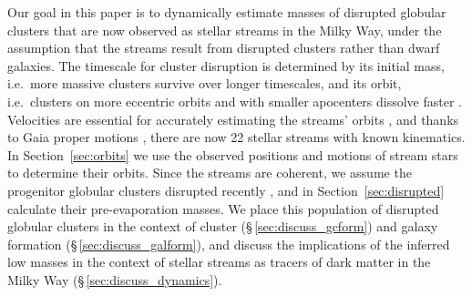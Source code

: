 \documentclass[twocolumn]{aastex63}
\newcommand{\msun}{\ensuremath{\textrm{M}_\odot}}
\begin{document}
Our goal in this paper is to dynamically estimate masses of disrupted globular clusters that are now observed as stellar streams in the Milky Way, under the assumption that the streams result from disrupted clusters rather than dwarf galaxies.
The timescale for cluster disruption is determined by its initial mass, i.e.\ more massive clusters survive over longer timescales, and its orbit, i.e.\ clusters on more eccentric orbits and with smaller apocenters dissolve faster \citep{baumgardt03,kruijssen09}.
Velocities are essential for accurately estimating the streams' orbits \citep{bh:2018}, and thanks to Gaia proper motions \citep{gdr2}, there are now 22 stellar streams with known kinematics.
In Section~\ref{sec:orbits} we use the observed positions and motions of stream stars to determine their orbits.
Since the streams are coherent, we assume the progenitor globular clusters disrupted recently \citep{helmi:2003}, and in Section~\ref{sec:disrupted} calculate their pre-evaporation masses.
We place this population of disrupted globular clusters in the context of cluster (\S\,\ref{sec:discuss_gcform}) and galaxy formation (\S\,\ref{sec:discuss_galform}), and discuss the implications of the inferred low masses in the context of stellar streams as tracers of dark matter in the Milky Way (\S\,\ref{sec:discuss_dynamics}).

% 


% 
\end{document}
